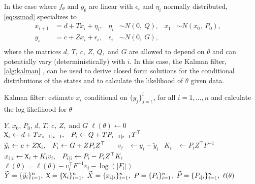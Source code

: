 \documentclass[12pt]{article}
\DeclareRobustCommand{\varx}{{\mathpalette\irchi\relax}}
\newcommand{\irchi}[2]{\protect\raisebox{\depth}{$#1\upchi$}}
\begin{document}
In the case where $f_\theta$ and $g_\theta$ are linear with $\epsilon_i$ and
$\eta_i$ normally distributed, \eqref{eq:ssmod} specializes to
\begin{equation}
  \begin{aligned}
    x_{i+1}&= d+T x_i + \eta_{i}, 
    & \eta_i &\sim N(0,\ Q),     
    &x_1 &\sim N(x_0,\ P_0),\\
    y_i&= c + Z x_i + \epsilon_i,     
    & \epsilon_i &\sim N(0,\ G), \\
  \end{aligned}
  \label{eq:lgmod}
\end{equation}
where the matrices $d,\ T,\ c,\ Z,\ Q,$ and $G$ are allowed to depend
on $\theta$ and can potentially vary (deterministically) with $i$. In this case,
the Kalman filter, \autoref{alg:kalman} \citep[see e.g.][]{Kalman1960,Harvey1990},
can be used to derive closed form 
solutions for the conditional
distributions of the states and to calculate the likelihood of $\theta$
given data. 
\begin{algorithm}[t!]
  \begin{singlespace}
  \caption{Kalman filter: estimate $x_i$ conditional on
    $\{y_j\}_{j=1}^i$, for all $i=1,\ldots,n$ and calculate the log likelihood
    for $\theta$\label{alg:kalman}}
  \begin{algorithmic}
     $Y$, $x_0$, $P_0$, $d,\ T,\ c,\ Z,$ and $G$
    \STATE $\ell(\theta) \leftarrow 0$ 
    \STATE $\begin{aligned}\varx_{i}
      &\leftarrow d + T x_{i-1|i-1}, & P_i &\leftarrow Q + T P_{i-1|i-1}
      T^\top\end{aligned}$ 
    \STATE $\begin{aligned}\widetilde{y}_i
      &\leftarrow c + Z \varx_i, & F_i &\leftarrow G + Z P_i
      Z^\top\end{aligned}$ 
    \STATE $\begin{aligned}v_i&\leftarrow y_i-\widetilde{y}_i& K_i&
      \leftarrow P_i Z^\top F^{-1}\end{aligned}$ 
    \STATE $\begin{aligned} x_{i|i}
      &\leftarrow \varx_i + K_i v_i, & P_{i|i} &\leftarrow P_i - P_iZ^\top
      K_i\end{aligned}$ 
    \STATE $\ell(\theta) = \ell(\theta) -v_i^\top F^{-1}v_i - \log(|F_i|)$
    \ENDFOR
    \RETURN $\widetilde{Y}=\{\widetilde{y}_i\}_{i=1}^n,\ \varx=\{\varx_i\}_{i=1}^n,\
    \widetilde{X}=\{x_{i|i}\}_{i=1}^n,\ P=\{P_i\}_{i=1}^n,\
    \widetilde{P}=\{P_{i|i}\}_{i=1}^n,\ \ell(\theta)$
  \end{algorithmic}
\end{singlespace}
\end{algorithm}
\end{document}
